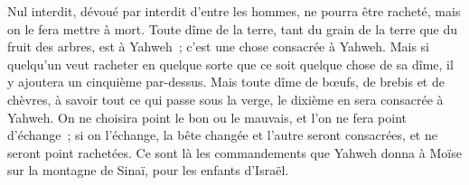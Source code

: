 \begin{multicols}{2}
Nul interdit, dévoué par interdit d'entre les hommes, ne pourra être racheté, mais on le fera mettre à mort.
Toute dîme de la terre, tant du grain de la terre que du fruit des arbres, est à Yahweh~; c'est une chose consacrée à Yahweh.
Mais si quelqu'un veut racheter en quelque sorte que ce soit quelque chose de sa dîme, il y ajoutera un cinquième par-dessus.
Mais toute dîme de bœufs, de brebis et de chèvres, à savoir tout ce qui passe sous la verge, le dixième en sera consacrée à Yahweh.
On ne choisira point le bon ou le mauvais, et l'on ne fera point d'échange~; si on l'échange, la bête changée et l'autre seront consacrées, et ne seront point rachetées.
Ce sont là les commandements que Yahweh donna à Moïse sur la montagne de Sinaï, pour les enfants d'Israël.
\PPE{}
\end{multicols}
